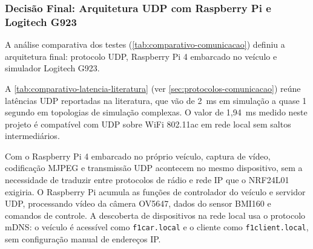 \subsubsection{Decisão Final: Arquitetura UDP com Raspberry Pi e Logitech G923}

A análise comparativa dos testes (\autoref{tab:comparativo-comunicacao}) definiu a arquitetura final: protocolo \gls{UDP}, Raspberry Pi 4 embarcado no veículo e simulador Logitech G923.

\begin{table}[!h]
\captionsetup{width=16cm}
\end{table}

A \autoref{tab:comparativo-latencia-literatura} (ver \autoref{sec:protocolos-comunicacao}) reúne latências \gls{UDP} reportadas na literatura, que vão de 2~ms em simulação a quase 1 segundo em topologias de simulação complexas. O valor de 1,94~ms medido neste projeto é compatível com \gls{UDP} sobre WiFi 802.11ac em rede local sem saltos intermediários.

Com o Raspberry Pi 4 embarcado no próprio veículo, captura de vídeo, codificação \gls{MJPEG} e transmissão \gls{UDP} acontecem no mesmo dispositivo, sem a necessidade de traduzir entre protocolos de rádio e rede \gls{IP} que o NRF24L01 exigiria. O Raspberry Pi acumula as funções de controlador do veículo e servidor \gls{UDP}, processando vídeo da câmera OV5647, dados do sensor BMI160 e comandos de controle. A descoberta de dispositivos na rede local usa o protocolo \gls{mDNS}: o veículo é acessível como \texttt{f1car.local} e o cliente como \texttt{f1client.local}, sem configuração manual de endereços \gls{IP}.

